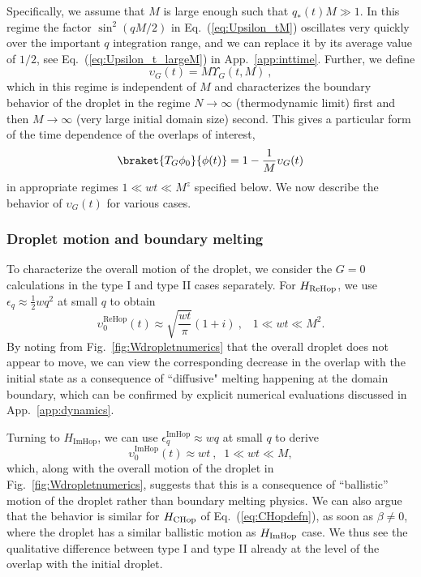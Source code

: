 \documentclass[prx,letterpaper,aps,superscriptaddress,floatfix,twocolumn,nofootinbib]{revtex4-2}
\theoremstyle{definition}
\begin{document}
%
Specifically, we assume that $M$ is large enough such that $q_*(t) M \gg 1$.
%
In this regime the factor $\sin^2(qM/2)$ in Eq.~(\ref{eq:Upsilon_tM}) oscillates very quickly over the important $q$ integration range, and we can replace it by its average value of $1/2$, see Eq.~(\ref{eq:Upsilon_t_largeM}) in App.~\ref{app:inttime}.
%
Further, we define 
\begin{equation}
    \upsilon_G(t) = M \Upsilon_G(t,M) ~,
\end{equation}
which in this regime is independent of $M$ and characterizes the boundary behavior of the droplet in the regime $N \to \infty$ (thermodynamic limit) first and then $M \to \infty$ (very large initial domain size) second.
%
This gives a particular form of the time dependence of the overlaps of interest,
\begin{equation}
\braket{T_G \phi_0}{\phi(t)} = 1 - \frac{1}{M} \upsilon_G(t)
\end{equation}
in appropriate regimes $1 \ll wt \ll M^z$ specified below.
%
We now describe the behavior of $\upsilon_G(t)$ for various cases.
%

%
\subsubsection{Droplet motion and boundary melting}

To characterize the overall motion of the droplet, we consider the $G = 0$ calculations in the type I and type II cases separately.
%
For $H_{\rm ReHop}$, we use $\epsilon_q \approx \frac{1}{2}w q^2$ at small $q$ to obtain
\begin{equation}
\upsilon^{\text{ReHop}}_0(t) \approx \sqrt{\frac{wt}{\pi}} (1 + i) ~,\;\;\;1 \ll wt \ll M^2. 
\label{eq:upsilonReHop_main}
\end{equation}
%
By noting from Fig.~\ref{fig:Wdropletnumerics} that the overall droplet does not appear to move, we can view the corresponding decrease in the overlap with the initial state as a consequence of ``diffusive" melting happening at the domain boundary, which can be confirmed by explicit numerical evaluations discussed in  App.~\ref{app:dynamics}.
%


%
Turning to $H_{\text{ImHop}}$, we can use $\epsilon_q^{\text{ImHop}} \approx wq$ at small $q$ to derive
\begin{equation}
\upsilon^{\text{ImHop}}_0(t) \approx wt ~,\;\;1 \ll wt \ll M,
\label{eq:upsilonImHop_main}
\end{equation}
which, along with the overall motion of the droplet in Fig.~\ref{fig:Wdropletnumerics}, suggests that this is a consequence of ``ballistic'' motion of the droplet rather than boundary melting physics.
%
We can also argue that the behavior is similar for $H_{\rm CHop}$ of Eq.~(\ref{eq:CHopdefn}), as soon as $\beta \neq 0$, where the droplet has a similar ballistic motion as $H_{\rm ImHop}$ case. 
%
We thus see the qualitative difference between type I and type II already at the level of the overlap with the initial droplet.
%
\end{document}
